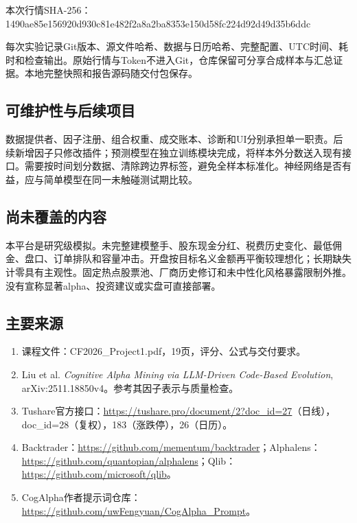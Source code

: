 \documentclass[UTF8,a4paper]{ctexart}
\begin{document}
\noindent 本次行情SHA-256：\\
{\ttfamily\scriptsize 1490ae85e156920d930c81e482f2a8a2ba8353e150d58fc224d92d49d35b6ddc}

每次实验记录Git版本、源文件哈希、数据与日历哈希、完整配置、UTC时间、耗时和检查输出。原始行情与Token不进入Git，仓库保留可分享合成样本与汇总证据。本地完整快照和报告源码随交付包保存。

\subsection*{可维护性与后续项目}
数据提供者、因子注册、组合权重、成交账本、诊断和UI分别承担单一职责。后续新增因子只修改插件；预测模型在独立训练模块完成，将样本外分数送入现有接口。需要按时间划分数据、清除跨边界标签，避免全样本标准化。神经网络是否有益，应与简单模型在同一未触碰测试期比较。

\subsection*{尚未覆盖的内容}
本平台是研究级模拟。未完整建模整手、股东现金分红、税费历史变化、最低佣金、盘口、订单排队和容量冲击。开盘按目标名义金额再平衡较理想化；长期缺失计零具有主观性。固定热点股票池、厂商历史修订和未中性化风格暴露限制外推。没有宣称显著alpha、投资建议或实盘可直接部署。

\subsection*{主要来源}
\begin{enumerate}\small
\item 课程文件：CF2026\_Project1.pdf，19页，评分、公式与交付要求。
\item Liu et al. \textit{Cognitive Alpha Mining via LLM-Driven Code-Based Evolution}, arXiv:2511.18850v4。参考其因子表示与质量检查。
\item Tushare官方接口：\url{https://tushare.pro/document/2?doc_id=27}（日线），doc\_id=28（复权），183（涨跌停），26（日历）。
\item Backtrader：\url{https://github.com/mementum/backtrader}；Alphalens：\url{https://github.com/quantopian/alphalens}；Qlib：\url{https://github.com/microsoft/qlib}。
\item CogAlpha作者提示词仓库：\url{https://github.com/uwFengyuan/CogAlpha_Prompt}。
\end{enumerate}
\end{document}
